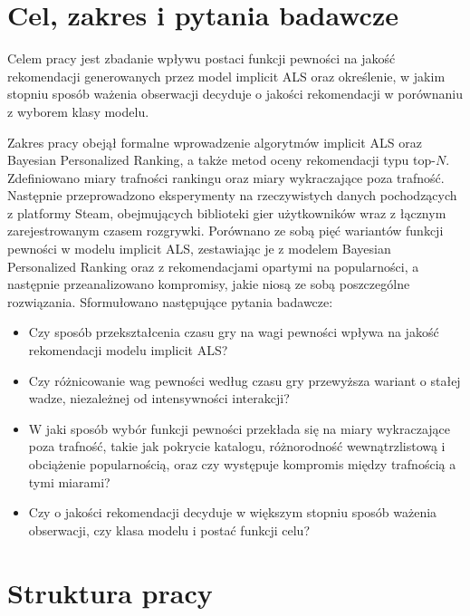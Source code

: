 \section{Cel, zakres i pytania badawcze}

Celem pracy jest zbadanie wpływu postaci funkcji pewności na jakość rekomendacji generowanych przez model implicit ALS oraz określenie, w jakim stopniu sposób ważenia obserwacji decyduje o jakości rekomendacji w porównaniu z wyborem klasy modelu.

Zakres pracy obejął formalne wprowadzenie algorytmów implicit ALS oraz Bayesian Personalized Ranking, a także metod oceny rekomendacji typu top-$N$. Zdefiniowano miary trafności rankingu oraz miary wykraczające poza trafność. Następnie przeprowadzono eksperymenty na rzeczywistych danych pochodzących z platformy Steam, obejmujących biblioteki gier użytkowników wraz z łącznym zarejestrowanym czasem rozgrywki. Porównano ze sobą pięć wariantów funkcji pewności w modelu implicit ALS, zestawiając je z modelem Bayesian Personalized Ranking oraz z rekomendacjami
opartymi na popularności, a następnie przeanalizowano kompromisy, jakie niosą ze sobą poszczególne rozwiązania.
Sformułowano następujące pytania badawcze:

\begin{itemize}
    \item[\textbf{PB1.}] Czy sposób przekształcenia czasu gry na wagi pewności wpływa na jakość rekomendacji modelu implicit ALS?

    \item[\textbf{PB2.}] Czy różnicowanie wag pewności według czasu gry przewyższa wariant o stałej wadze, niezależnej od intensywności interakcji?

    \item[\textbf{PB3.}] W jaki sposób wybór funkcji pewności przekłada się na miary wykraczające poza trafność, takie jak pokrycie katalogu, różnorodność wewnątrzlistową i obciążenie popularnością, oraz czy występuje kompromis między trafnością a tymi miarami?

    \item[\textbf{PB4.}] Czy o jakości rekomendacji decyduje w większym stopniu sposób ważenia obserwacji, czy klasa modelu i postać funkcji celu?
\end{itemize}

\section{Struktura pracy}


